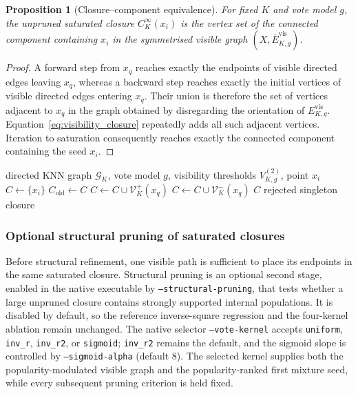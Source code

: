 \documentclass[review,12pt]{elsarticle}
\newtheorem{proposition}[theorem]{Proposition}
\newcommand{\calG}{\mathcal{G}}
\newcommand{\calV}{\mathcal{V}}
\begin{document}
\begin{proposition}[Closure--component equivalence]
\label{prop:closure_component}
For fixed $K$ and vote model $g$, the unpruned saturated closure
$C_K^\infty(x_i)$ is the vertex set of the connected component containing
$x_i$ in the symmetrised visible graph
$(X,\overline E^{\mathrm{vis}}_{K,g})$.
\end{proposition}

\begin{proof}
A forward step from $x_q$ reaches exactly the endpoints of visible directed
edges leaving $x_q$, whereas a backward step reaches exactly the initial
vertices of visible directed edges entering $x_q$. Their union is therefore
the set of vertices adjacent to $x_q$ in the graph obtained by disregarding
the orientation of $E^{\mathrm{vis}}_{K,g}$.
Equation~\eqref{eq:visibility_closure} repeatedly adds all such adjacent
vertices. Iteration to saturation consequently reaches exactly the connected
component containing the seed $x_i$.
\end{proof}

\begin{algorithm}[t]
\caption{Visibility-filtered round-trip closure for one point}
\label{alg:visibility_closure}
\begin{algorithmic}[1]
\Require directed KNN graph $\calG_K$, vote model $g$,
visibility thresholds $V_{K,g}^{(2)}$, point $x_i$
\State $C \gets \{x_i\}$
\Repeat
    \State $C_{\mathrm{old}}\gets C$
        \State $C\gets C\cup\calV_K^+(x_q)$
        \State $C\gets C\cup\calV_K^-(x_q)$
    \EndFor
{}
    \State \Return $C$
\Else
    \State \Return rejected singleton closure
\EndIf
\end{algorithmic}
\end{algorithm}


\subsubsection{Optional structural pruning of saturated closures}
\label{sec:structural_pruning}

Before structural refinement, one visible path is sufficient to place its
endpoints in the same saturated closure. Structural pruning is an optional second stage,
enabled in the native executable by \texttt{--structural-pruning}, that tests
whether a large unpruned closure contains strongly supported internal
populations. It is disabled by default, so the reference inverse-square
regression and the four-kernel ablation remain unchanged. The native selector
\texttt{--vote-kernel} accepts \texttt{uniform}, \texttt{inv\_r},
\texttt{inv\_r2}, or \texttt{sigmoid}; \texttt{inv\_r2} remains the default,
and the sigmoid slope is controlled by \texttt{--sigmoid-alpha} (default $8$).
The selected kernel supplies both the popularity-modulated visible graph and
the popularity-ranked first mixture seed, while every subsequent pruning
criterion is held fixed.
\end{document}
